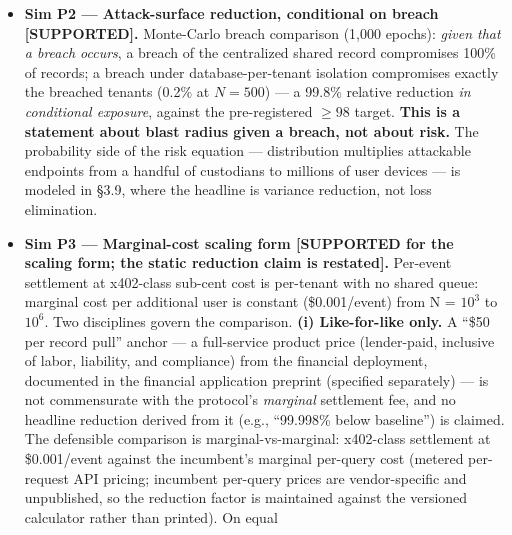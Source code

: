 \documentclass[
]{article}
\begin{document}
\begin{itemize}
  Figure 8. Sim P1c (§3.6): sparse/weighted-network sensitivity of the
  Kuramoto coherence claim (SIM-R2 battery 4, seed 42). {R(K)} per
  topology (mean {±} sd over 2 graph realizations {×} 2 seeds) against
  the all-to-all reference, with the {R = 0.7} target, the
  {\(1/\sqrt{N}\)} floor, and the {K = 4.5} operating point marked. The
  continuous onset at {Kc ≈ 2} is topology-invariant; the {K = 4.5}
  coherence level fails for {⟨k⟩ ≲ 25} (ER {p = 0.05}: 0.684; BA
  {m = 12}: 0.687; BA {m = 2}: 0.416) and survives weight heterogeneity
  (log-normal weighted all-to-all: 0.710).
\item
  \textbf{Sim P2 --- Attack-surface reduction, conditional on breach
  {[}SUPPORTED{]}.} Monte-Carlo breach comparison (1,000 epochs):
  \emph{given that a breach occurs}, a breach of the centralized shared
  record compromises 100\% of records; a breach under
  database-per-tenant isolation compromises exactly the breached tenants
  (0.2\% at \(N = 500\)) --- a 99.8\% relative reduction \emph{in
  conditional exposure}, against the pre-registered \(\geq 98%
  \) target. \textbf{This is a statement about blast radius given a
  breach, not about risk.} The probability side of the risk equation ---
  distribution multiplies attackable endpoints from a handful of
  custodians to millions of user devices --- is modeled in §3.9, where
  the headline is variance reduction, not loss elimination.
\item
  \textbf{Sim P3 --- Marginal-cost scaling form {[}SUPPORTED for the
  scaling form; the static reduction claim is restated{]}.} Per-event
  settlement at x402-class sub-cent cost is per-tenant with no shared
  queue: marginal cost per additional user is constant (\$0.001/event)
  from N = \(10^{3}\) to \(10^{6}\). Two disciplines govern the
  comparison. \textbf{(i) Like-for-like only.} A ``\$50 per record
  pull'' anchor --- a full-service product price (lender-paid, inclusive
  of labor, liability, and compliance) from the financial deployment,
  documented in the financial application preprint (specified
  separately) --- is not commensurate with the protocol's
  \emph{marginal} settlement fee, and no headline reduction derived from
  it (e.g., ``99.998\% below baseline'') is claimed. The defensible
  comparison is marginal-vs-marginal: x402-class settlement at
  \$0.001/event against the incumbent's marginal per-query cost (metered
  per-request API pricing; incumbent per-query prices are
  vendor-specific and unpublished, so the reduction factor is maintained
  against the versioned calculator rather than printed). On equal

\end{itemize}
\end{document}
